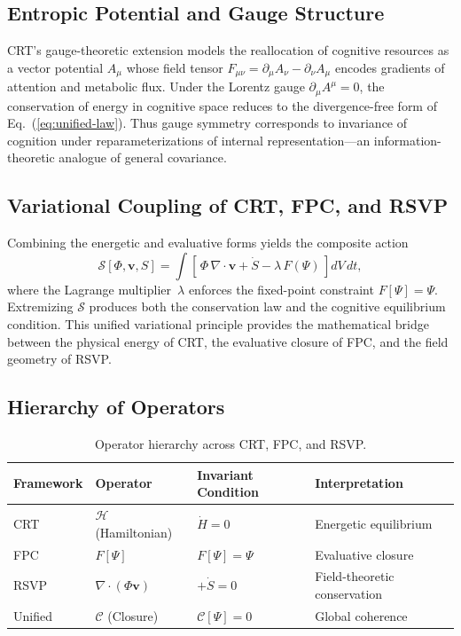 \documentclass[12pt,a4paper]{article}
\begin{document}
\subsection{Entropic Potential and Gauge Structure}

CRT’s gauge-theoretic extension models the reallocation of cognitive resources as a vector potential \(A_\mu\) whose field tensor
\(F_{\mu\nu}=\partial_\mu A_\nu-\partial_\nu A_\mu\)
encodes gradients of attention and metabolic flux.
Under the Lorentz gauge \(\partial_\mu A^\mu=0\),
the conservation of energy in cognitive space reduces to the divergence-free form of Eq.~(\ref{eq:unified-law}).
Thus gauge symmetry corresponds to invariance of cognition under reparameterizations of internal representation—an information-theoretic analogue of general covariance.

\subsection{Variational Coupling of CRT, FPC, and RSVP}

Combining the energetic and evaluative forms yields the composite action
\begin{equation}
\mathcal{S}[\Phi,\mathbf{v},S]
  = \int \!\!\left[\,\Phi\,\nabla\!\cdot\mathbf{v} + \dot S - \lambda\,F(\Psi)\,\right] dV\,dt,
\end{equation}
where the Lagrange multiplier~\(\lambda\) enforces the fixed-point constraint \(F[\Psi]=\Psi\).
Extremizing \(\mathcal{S}\) produces both the conservation law and the cognitive equilibrium condition.
This unified variational principle provides the mathematical bridge between the physical energy of CRT, the evaluative closure of FPC, and the field geometry of RSVP.

\subsection{Hierarchy of Operators}

\begin{table}[h!]
\centering
\begin{tabular}{llll}
\toprule
\textbf{Framework} & \textbf{Operator} & \textbf{Invariant Condition} & \textbf{Interpretation}\\
\midrule
CRT & $\mathcal{H}$ (Hamiltonian) & $\dot H=0$ & Energetic equilibrium\\
FPC & $F[\Psi]$ & $F[\Psi]=\Psi$ & Evaluative closure\\
RSVP & $\nabla\!\cdot(\Phi\mathbf{v})$ & $+\dot S=0$ & Field-theoretic conservation\\
Unified & $\mathcal{C}$ (Closure) & $\mathcal{C}[\Psi]=0$ & Global coherence\\
\bottomrule
\end{tabular}
\caption{Operator hierarchy across CRT, FPC, and RSVP.}
\end{table}
\end{document}
